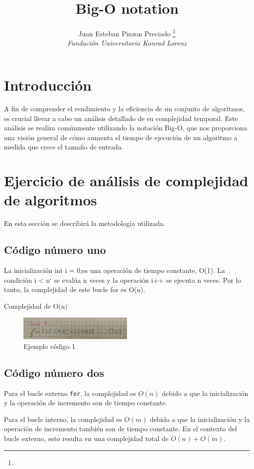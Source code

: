 \documentclass[journal, spanish]{IEEEtran}
\title{ Big-O notation}
\author{Juan Esteban Pinzon Preciado \thanks{} \\
\textit{Fundación Universitaria Konrad Lorenz} \\
}
\begin{document}
\maketitle

\section{Introducción}

A fin de comprender el rendimiento y la eficiencia de un conjunto de algoritmos, es crucial llevar a cabo un análisis detallado de su complejidad temporal. Este análisis se realiza comúnmente utilizando la notación Big-O, que nos proporciona una visión general de cómo aumenta el tiempo de ejecución de un algoritmo a medida que crece el tamaño de entrada.

\section{Ejercicio de análisis de complejidad de algoritmos}
En esta sección se describirá la metodología utilizada.

\subsection{Código número uno}
 La inicialización int i = 0;es una operación de tiempo constante, O(1). La condición i < n` se evalúa n veces y la operación i++ se ejecuta n veces. Por lo tanto, la complejidad de este bucle for es O(n).

 Complejidad de O(n)

\begin{figure}[H]
  \centering
  \includegraphics[width=0.5\textwidth]{WhatsApp Image 2023-09-11 at 7.54.49 PM.jpeg}
  \caption{Ejemplo código 1}
  
  \label{fig:imagen1}
\end{figure}


\subsection{Código número dos}
Para el bucle externo \texttt{for}, la complejidad es $O(n)$ debido a que la inicialización y la operación de incremento son de tiempo constante.

Para el bucle interno, la complejidad es $O(m)$ debido a que la inicialización y la operación de incremento también son de tiempo constante. En el contexto del bucle externo, esto resulta en una complejidad total de $O(n) + O(m)$.
\end{document}
